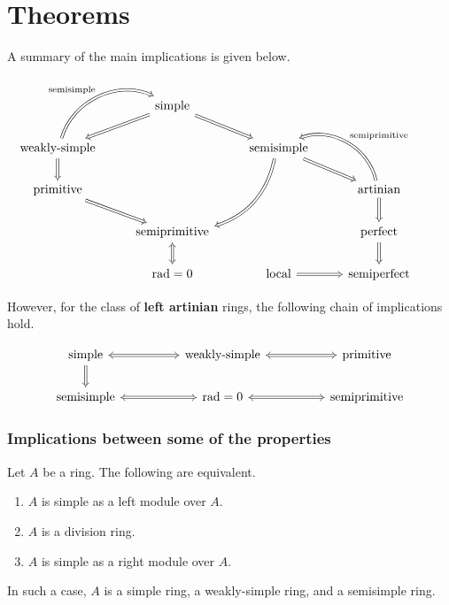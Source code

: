\documentclass[12pt]{article}
\begin{document}
\part{Theorems} \label{part:theorems}

A summary of the main implications is given below.

\begin{equation*} 
	\begin{tikzcd}
	 & \text{simple} \arrow[ld, Rightarrow] \arrow[rd, Rightarrow] && \\
	\text{weakly-simple} \arrow[ru, Rightarrow, "\text{semisimple}", bend left=49] \arrow[d, Rightarrow] && \text{semisimple} \arrow[ldd, Rightarrow, bend left] \arrow[rd, Rightarrow] & \\
	\text{primitive} \arrow[rd, Rightarrow]  & & & \text{artinian} \arrow[lu, "\text{semiprimitive}"', Rightarrow, bend right=49] \arrow[d, Rightarrow] & \\
 & \text{semiprimitive} \arrow[d, Leftrightarrow]  &  & \text{perfect} \arrow[d, Rightarrow] \\
 & \rad = 0 & \text{local} \arrow[r, Rightarrow] & \text{semiperfect}  &
	\end{tikzcd}
\end{equation*}

\newcommand{\artinianimplications}[1]{%
\begin{equation*} 
	\begin{tikzcd}[ampersand replacement = \&, background color=#1]
		\text{simple} \arrow[rr, Leftrightarrow] \arrow[d, Rightarrow] \&  \& \text{weakly-simple} \arrow[rr, Leftrightarrow] \&  \& \text{primitive} \\
	\text{semisimple} \arrow[rr, Leftrightarrow]  \&  \& \rad = 0 \arrow[rr, Leftrightarrow] \& \& \text{semiprimitive}
	\end{tikzcd}	
\end{equation*}
}

However, for the class of \textbf{{\color{red}left artinian}} rings, the following chain of implications hold.

\artinianimplications{white}

\section{Implications between some of the properties}

\begin{thm} \label{thm:simple-as-a-module}
	Let $A$ be a ring. The following are equivalent.
	\begin{enumerate}[label=(\alph*)]
		\item $A$ is simple as a left module over $A$.
		\item $A$ is a division ring.
		\item $A$ is simple as a right module over $A$.
	\end{enumerate}
	In such a case, $A$ is a simple ring, a weakly-simple ring, and a semisimple ring.
\end{thm}
\end{document}
